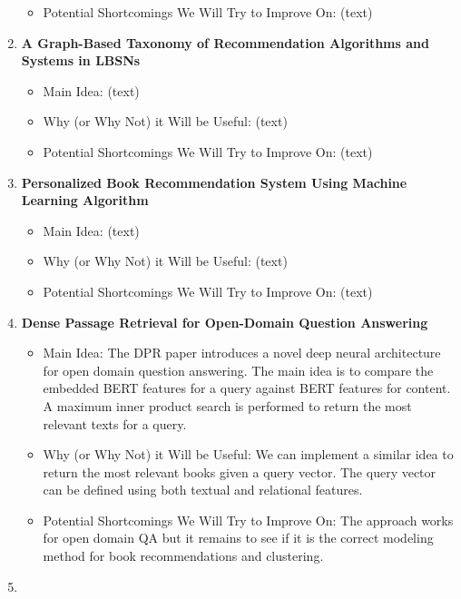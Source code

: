 \begin{enumerate}[label=(\arabic*)]
\begin{itemize}
        \item Potential Shortcomings We Will Try to Improve On: (text)
    \end{itemize}
    \item \cite{kefalas2016taxonomy}
    \textbf{A Graph-Based Taxonomy of Recommendation Algorithms and Systems in LBSNs}
    \begin{itemize}
        \item Main Idea: (text)
        \item Why (or Why Not) it Will be Useful: (text)
        \item Potential Shortcomings We Will Try to Improve On: (text)
    \end{itemize}
    \item \cite{sarma2021machinelearning}
    \textbf{Personalized Book Recommendation System Using Machine Learning Algorithm}
    \begin{itemize}
        \item Main Idea: (text)
        \item Why (or Why Not) it Will be Useful: (text)
        \item Potential Shortcomings We Will Try to Improve On: (text)
    \end{itemize}
    \item \cite{karpukhin2020dense}
    \textbf{Dense Passage Retrieval for Open-Domain Question Answering}
    \begin{itemize}
        \item Main Idea: The DPR paper introduces a novel deep neural architecture for open domain question answering. The main idea is to compare the embedded BERT features for a query against BERT features for content. A maximum inner product search is performed to return the most relevant texts for a query.
        \item Why (or Why Not) it Will be Useful: We can implement a similar idea to return the most relevant books given a query vector. The query vector can be defined using both textual and relational features.
        \item Potential Shortcomings We Will Try to Improve On: The approach works for open domain QA but it remains to see if it is the correct modeling method for book recommendations and clustering.
    \end{itemize}
    \item
    \cite{maaten2008tsne}

\end{enumerate}

